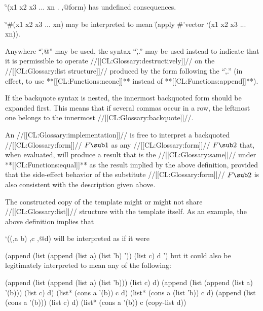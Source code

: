 \itemitem{\bull}
\f{`(x1 x2 x3 ... xn . ,@form)} has undefined consequences.


\itemitem{\bull}
\f{`\#(x1 x2 x3 ... xn)} may be interpreted to mean
\f{(apply \#'vector `(x1 x2 x3 ... xn))}.
\endlist



Anywhere ``\f{,@}'' may be used, the syntax ``\f{,.}'' may be used instead
to indicate that it is permissible to operate //[[CL:Glossary:destructively]]// on 
the //[[CL:Glossary:list structure]]//  produced by the form following the ``\f{,.}'' 
(in effect, to use **[[CL:Functions:nconc]]** instead of **[[CL:Functions:append]]**).


If the backquote syntax is nested, the innermost backquoted form
should be expanded first.  This means that if several commas occur
in a row, the leftmost one belongs to the innermost //[[CL:Glossary:backquote]]//.














An //[[CL:Glossary:implementation]]// is free to interpret a backquoted //[[CL:Glossary:form]]// $F\sub 1$
as any //[[CL:Glossary:form]]// $F\sub 2$ that, when evaluated, will produce a result that is
the //[[CL:Glossary:same]]// under **[[CL:Functions:equal]]** as the result implied by the above definition, 
provided that the side-effect behavior of the substitute //[[CL:Glossary:form]]// $F\sub 2$ 
is also consistent with the description given above.

The constructed
copy of the template might or might not share //[[CL:Glossary:list]]// structure with the
template itself.  As an example, the above definition implies that

\code
 `((,a b) ,c ,@d)
\endcode
will be interpreted as if it were

\code
 (append (list (append (list a) (list 'b) '\nil)) (list c) d '\nil)
\endcode
but it could also be legitimately interpreted to mean any of the following:

\code
 (append (list (append (list a) (list 'b))) (list c) d)
 (append (list (append (list a) '(b))) (list c) d)
 (list* (cons a '(b)) c d)
 (list* (cons a (list 'b)) c d)
 (append (list (cons a '(b))) (list c) d)
 (list* (cons a '(b)) c (copy-list d))
\endcode
               

